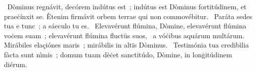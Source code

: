 ~Dòminus regnávit, decórem indútus est~; indútus est Dòminus fortitúdinem, et praeċínxit se. Ètenim firmávit orbem terrae qui non commovébitur. 
~Paráta sedes tua e tunc~; a sáeculo tu es. 
~Elevavérunt flúmina, Dòmine, elevavérunt flúmina voċem suam~; elevavérunt flúmina fluctüs suos, 
~a vóċibus aquárum multárum. Mirábiles elaçiónes maris~; mirábilis in altïs Dòminus. 
~Testimónia tua credibìlia fàcta sunt nìmis~; domum tuam dèċet sanctitúdo, Dòmine, in lonġitúdinem diérum. 
